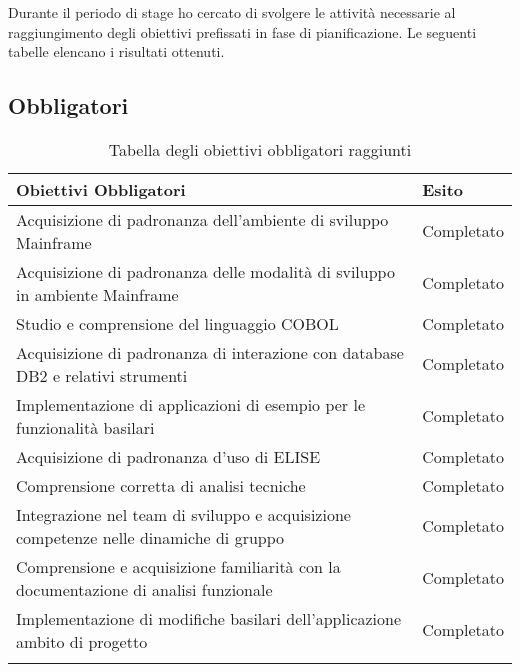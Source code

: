 Durante il periodo di stage ho cercato di svolgere le attività necessarie al raggiungimento degli obiettivi prefissati in fase di pianificazione. Le seguenti tabelle elencano i risultati ottenuti.

\subsection{Obbligatori}

		\begin{center}
		  \bgroup
		  \def\arraystretch{1.4}
		   \begin{longtable}{ | p{9cm} | p{2cm} | }  \hline
			 
			 \cellcolor[gray]{0.9} \textbf{Obiettivi Obbligatori} & \cellcolor[gray]{0.9} \textbf{Esito} \\ \hline
						 
			 Acquisizione di padronanza dell'ambiente di sviluppo Mainframe & Completato \\ \hline
			 Acquisizione di padronanza delle modalità di sviluppo in ambiente Mainframe & Completato \\ \hline
			 Studio e comprensione del linguaggio COBOL & Completato \\ \hline
			 Acquisizione di padronanza di interazione con database DB2 e relativi strumenti & Completato \\ \hline
			 Implementazione di applicazioni di esempio per le funzionalità basilari & Completato \\ \hline
			 Acquisizione di padronanza d'uso di ELISE & Completato \\ \hline
			 Comprensione corretta di analisi tecniche & Completato \\ \hline
			 Integrazione nel team di sviluppo e acquisizione competenze nelle dinamiche di gruppo & Completato \\ \hline
			 Comprensione e acquisizione familiarità con la documentazione di analisi funzionale & Completato \\ \hline
			 Implementazione di modifiche basilari dell'applicazione ambito di progetto & Completato \\ \hline
			
			\caption{Tabella degli obiettivi obbligatori raggiunti}
			
		    \end{longtable}
		  \egroup
		\end{center}



